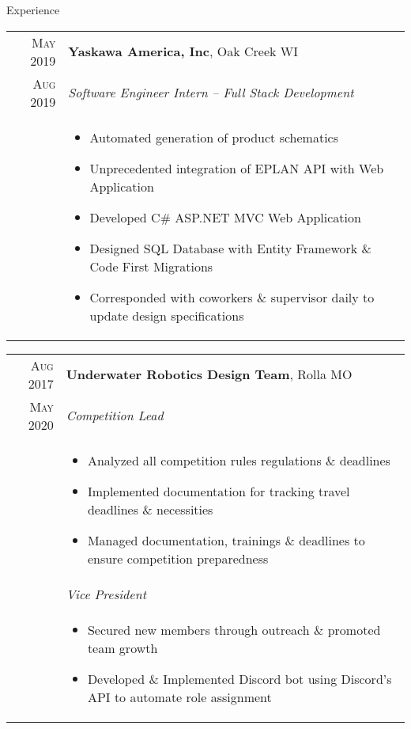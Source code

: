 \documentclass{resume}
\begin{document}
\begin{rSection}{Experience}
{  \begin{tabular}{r|p{15cm}}
    \textsc{May 2019} & \textbf{Yaskawa America, Inc}, Oak Creek WI \\
    \textsc{Aug 2019}  & \textit{Software Engineer Intern – Full Stack Development} \\ &
    \begin{itemize}
        \item {Automated generation of product schematics}
        \item {Unprecedented integration of EPLAN API with Web Application}
        \item {Developed C\# ASP.NET MVC Web Application}
        \item {Designed SQL Database with Entity Framework \& Code First Migrations}
        \item {Corresponded with coworkers \& supervisor daily to update design specifications}
    \end{itemize}
  \end{tabular}
  
    \begin{tabular}{r|p{15cm}}
      \textsc{Aug 2017} & \textbf{Underwater Robotics Design Team}, Rolla MO \\
      \textsc{May 2020}  & \textit{Competition Lead} \\ &
      \begin{itemize}
          \item {Analyzed all competition rules regulations \& deadlines}
          \item {Implemented documentation for tracking travel deadlines \& necessities}
          \item {Managed documentation, trainings \& deadlines to ensure competition preparedness}
      \end{itemize}\\ &
      \textit{Vice President} \\ &
      \begin{itemize}
          \item {Secured new members through outreach \& promoted team growth}
          \item {Developed \& Implemented Discord bot using Discord's API to automate role assignment}
      \end{itemize}
    \end{tabular}
}
\end{rSection}
\end{document}

